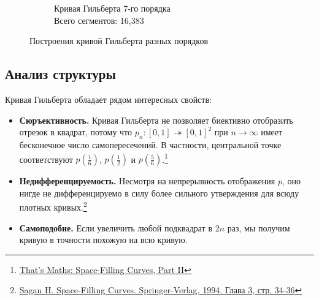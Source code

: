 \begin{figure}[H]
\begin{subfigure}{0.42\textwidth}
        \caption{Кривая Гильберта 7-го порядка \\ Всего сегментов: 16,383}
    \end{subfigure}
    \caption{Построения кривой Гильберта разных порядков}
\end{figure}

\subsection{Анализ структуры}

Кривая Гильберта обладает рядом интересных свойств:
\begin{itemize}
    \item \textbf{Сюръективность.} Кривая Гильберта не позволяет биективно отобразить отрезок в квадрат, потому что \( p_n\colon [0,1]\twoheadrightarrow [0,1]^2 \) при \( n\to\infty \) имеет бесконечное число самопересечений. В частности, центральной точке соответствуют \( p(\frac{1}{6}) \), \( p(\frac{1}{2}) \) и \( p(\frac{5}{6}) \).\footnote{\href{https://thatsmaths.com/2022/08/11/space-filling-curves-part-ii-computing-the-limit-function/}{That's Maths: Space-Filling Curves, Part II}}
    \item \textbf{Недифференцируемость.} Несмотря на непрерывность отображения \( p \), оно нигде не дифференцируемо в силу более сильного утверждения для всюду плотных кривых.\footnote{\href{https://www.google.com/books/edition/Space_Filling_Curves/cP_ZBwAAQBAJ?hl=en&gbpv=1&pg=PA34&printsec=frontcover}{Sagan H. Space-Filling Curves. Springer-Verlag, 1994. Глава 3, стр. 34-36}}
    \item \textbf{Самоподобие.} Если увеличить любой подквадрат в \( 2n \) раз, мы получим кривую в точности похожую на всю кривую.
\end{itemize}

